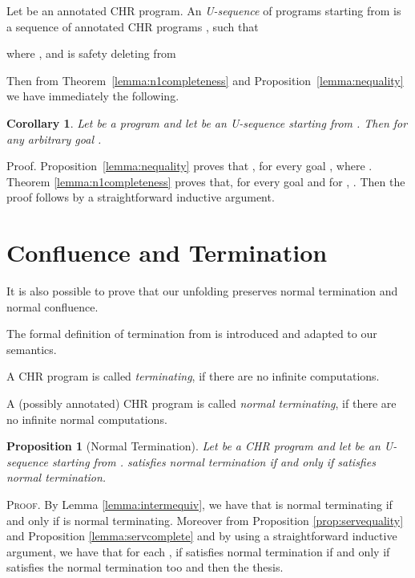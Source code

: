 \documentclass[final]{acmtrans2e}
\newtheorem{corollary}[theorem]{Corollary}
\newtheorem{proposition}[theorem]{Proposition}
\begin{document}
\begin{definition}[U-sequence]\label{def:uno}
Let  be an annotated CHR program. An \emph{U-sequence} of programs
starting from  is a sequence of annotated CHR programs , such that

 where ,  and   is
safety deleting from 
\end{definition}

Then from  Theorem~\ref{lemma:n1completeness} and
Proposition~\ref{lemma:nequality} we have immediately the
following.

\begin{corollary}\label{lemma:ncompleteness}
Let  be a program and let  be an U-sequence starting from . Then
 for any arbitrary goal
.
\end{corollary}

{\sc Proof.} Proposition~\ref{lemma:nequality} proves that , for every goal , where  .
Theorem \ref{lemma:n1completeness} proves that, for every goal  and for ,
. Then the proof follows by a straightforward inductive argument.
\\
\noindent{}


\section{Confluence and Termination}\label{sec:confluence&termination}

It is also possible to prove that our unfolding preserves normal termination and normal confluence.


The formal definition of termination from \cite{Fru04}
is introduced and adapted to our  semantics.

\begin{definition}[Termination]
A CHR program  is called \emph{terminating}, if there are no infinite computations.
\end{definition}

\begin{definition}
A (possibly annotated) CHR program  is called  \emph{normal terminating}, if there are no infinite normal computations.
\end{definition}

\begin{proposition}[Normal Termination]\label{prop:termination} Let  be a CHR program and
let  be an U-sequence starting from .  satisfies
normal termination if and only if   satisfies normal termination.
\end{proposition}
\textsc{Proof.}
By Lemma \ref{lemma:intermequiv}, we have that  is normal terminating if and only if  is normal terminating.
Moreover from Proposition \ref{prop:servequality} and Proposition \ref{lemma:servcomplete} and by using a straightforward inductive argument, we have that
for each , if  satisfies normal termination if and only if  satisfies the normal termination too and then the thesis.
\\
\noindent{} \\
\end{document}
